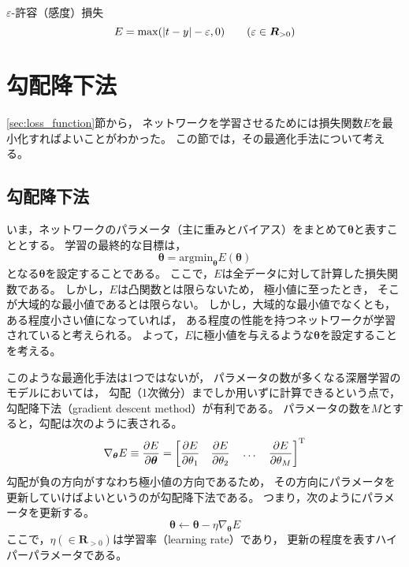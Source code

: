 \documentclass[class=jsarticle, crop=false, dvipdfmx, fleqn]{standalone}
\begin{document}
$\varepsilon$-許容（感度）損失
\begin{equation}
E = \max(|t - y| - \varepsilon, 0) \qquad \qty(\varepsilon \in \bm{R}_{>0})
\end{equation}



\section{勾配降下法}
\label{sec:gradient_descent}

\ref{sec:loss_function}節から，
ネットワークを学習させるためには損失関数$E$を最小化すればよいことがわかった。
この節では，その最適化手法について考える。


\subsection{勾配降下法}

いま，ネットワークのパラメータ（主に重みとバイアス）をまとめて$\bm{\theta}$と表すこととする。
学習の最終的な目標は，
\begin{equation}
\bm{\theta} = \mathrm{argmin}_{\bm{\theta}} E(\bm{\theta})
\end{equation}
となる$\bm{\theta}$を設定することである。
ここで，$E$は全データに対して計算した損失関数である。
しかし，$E$は凸関数とは限らないため，
極小値に至ったとき，
そこが大域的な最小値であるとは限らない。
しかし，大域的な最小値でなくとも，
ある程度小さい値になっていれば，
ある程度の性能を持つネットワークが学習されていると考えられる。
よって，$E$に極小値を与えるような$\bm{\theta}$を設定することを考える。

このような最適化手法は1つではないが，
パラメータの数が多くなる深層学習のモデルにおいては，
勾配（1次微分）までしか用いずに計算できるという点で，
勾配降下法（gradient descent method）が有利である。
パラメータの数を$M$とすると，勾配は次のように表される。
\begin{equation}
\nabla_{\bm{\theta}} E \equiv \pdv{E}{\bm{\theta}} =
	\qty[
		\pdv{E}{\theta_1} \quad
		\pdv{E}{\theta_2} \quad
		\dots \quad
		\pdv{E}{\theta_M}
	]^\mathrm{T}
\end{equation}
勾配が負の方向がすなわち極小値の方向であるため，
その方向にパラメータを更新していけばよいというのが勾配降下法である。
つまり，次のようにパラメータを更新する。
\begin{equation}
\bm{\theta} \leftarrow \bm{\theta} - \eta \nabla_{\bm{\theta}} E
\label{eq:update_param}
\end{equation}
ここで，$\eta (\in \bm{R}_{>0})$は学習率（learning rate）であり，
更新の程度を表すハイパーパラメータである。
\end{document}
